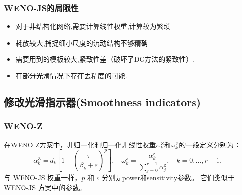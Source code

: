 \documentclass{book}
\begin{document}
\subsubsection{WENO-JS的局限性}
\begin{itemize}
    \item 对于非结构化网络,需要计算线性权重,计算较为繁琐
    \item 耗散较大,捕捉细小尺度的流动结构不够精确
    \item 需要用到的模板较大,紧致性差（破坏了DG方法的紧致性）.
    \item 在部分光滑情况下存在丢精度的可能.
\end{itemize}
\subsection{修改光滑指示器(Smoothness indicators)}
\subsubsection{WENO-Z}
在WENO-Z方案中，非归一化和归一化非线性权重$\alpha_{k}^{Z}$和$\omega_{k}^{Z}$的一般定义分别为：
\begin{equation}
    \alpha_{k}^{\mathrm{Z}}=d_{k}\left[1+\left(\frac{\tau}{\beta_{k}+\varepsilon}\right)^{p}\right], \quad \omega_{k}^{\mathrm{z}}=\frac{\alpha_{k}^{\mathrm{z}}}{\sum_{j=0}^{r-1} \alpha_{j}^{\mathrm{z}}}, \quad k=0, \ldots, r-1 .
\end{equation}
与 WENO-JS 权重一样，$p$ 和 $\varepsilon$ 分别是power和sensitivity参数。 它们类似于 WENO-JS 方案中的参数。
\end{document}
